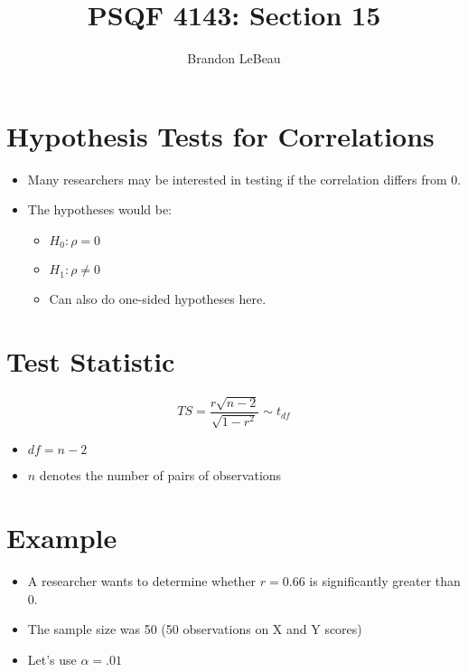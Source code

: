 \documentclass[12pt]{article}
\title{PSQF 4143: Section 15}
\author{Brandon LeBeau}
\date{}
\begin{document}
\maketitle

\section{Hypothesis Tests for
Correlations}\label{hypothesis-tests-for-correlations}

\begin{itemize}
\itemsep1pt\parskip0pt
\item
  Many researchers may be interested in testing if the correlation
  differs from 0.
\item
  The hypotheses would be:

  \begin{itemize}
  \itemsep1pt\parskip0pt
  \item
    \(H_{0}: \rho = 0\)
  \item
    \(H_{1}: \rho \neq 0\)
  \item
    Can also do one-sided hypotheses here.
  \end{itemize}
\end{itemize}

\section{Test Statistic}\label{test-statistic}

\[ TS = \frac{r\sqrt{n - 2}}{\sqrt{1 - r^2}} \sim t_{df} \]

\begin{itemize}
\itemsep1pt\parskip0pt
\item
  \(df = n - 2\)
\item
  \(n\) denotes the number of pairs of observations
\end{itemize}

\section{Example}\label{example}

\begin{itemize}
\itemsep1pt\parskip0pt
\item
  A researcher wants to determine whether \(r = 0.66\) is significantly
  greater than 0.
\item
  The sample size was 50 (50 observations on X and Y scores)
\item
  Let's use \(\alpha = .01\)
\end{itemize}
\end{document}

